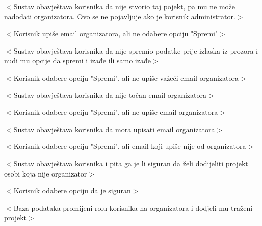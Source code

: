 \begin{packed_item}
\begin{packed_item}
\begin{packed_enum}
								\item $<$Sustav obavještava korisnika da nije stvorio taj pojekt, pa mu ne može nadodati organizatora.
								Ovo se ne pojavljuje ako je korisnik administrator.$>$
			
							\end{packed_enum}

							\item[9.a] $<$Korisnik upiše email organizatora, ali ne odabere opciju "Spremi"$>$
							\item[] \begin{packed_enum}

								\item $<$Sustav obavještava korisnika da nije spremio podatke prije izlaska
								iz prozora i nudi mu opcije da spremi i izađe ili samo izađe$>$

							\end{packed_enum}

							\item[9.b] $<$Korisnik odabere opciju "Spremi", ali ne upiše važeći email organizatora$>$
							\item[] \begin{packed_enum}

								\item $<$Sustav obavještava korisnika da nije točan email organizatora$>$

							\end{packed_enum}

							\item[9.c] $<$Korisnik odabere opciju "Spremi", ali ne upiše email organizatora$>$
							\item[] \begin{packed_enum}

								\item $<$Sustav obavještava korisnika da mora upisati email organizatora$>$

							\end{packed_enum}

							\item[9.d] $<$Korisnik odabere opciju "Spremi", ali email koji upiše nije od organizatora$>$
							\item[] \begin{packed_enum}

								\item $<$Sustav obavještava korisnika i pita ga je li siguran da želi dodijeliti projekt
								osobi koja nije organizator$>$
								\item $<$Korisnik odabere opciju da je siguran$>$
								\item $<$Baza podataka promijeni rolu korisnika na organizatora i dodjeli mu traženi projekt$>$

							\end{packed_enum}
					
						\end{packed_item}
					\end{packed_item}

